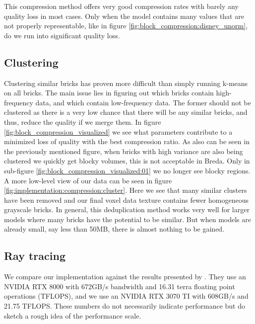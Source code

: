 This compression method offers very good compression rates with barely any quality loss in most cases. Only when the model contains many values that are not properly representable, like in figure \ref{fig:block_compression:disney_unorm}, do we run into significant quality loss.

\subsection{Clustering} \label{results:clustering}
Clustering similar bricks has proven more difficult than simply running k-means on all bricks. The main issue lies in figuring out which bricks contain high-frequency data, and which contain low-frequency data. The former should not be clustered as there is a very low chance that there will be any similar bricks, and thus, reduce the quality if we merge them. In figure \ref{fig:block_compression_visualized} we see what parameters contribute to a minimized loss of quality with the best compression ratio. As also can be seen in the previously mentioned figure, when bricks with high variance are also being clustered we quickly get blocky volumes, this is not acceptable in Breda. Only in sub-figure \ref{fig:block_compression_visualized:01} we no longer see blocky regions. A more low-level view of our data can be seen in figure \ref{fig:implementation:compression:cluster}. Here we see that many similar clusters have been removed and our final voxel data texture contains fewer homogeneous grayscale bricks.  In general, this deduplication method works very well for larger models where many bricks have the potential to be similar. But when models are already small, say less than 50MB, there is almost nothing to be gained.

\subsection{Ray tracing} \label{results:ray_tracing}
We compare our implementation against the results presented by \cite{NanoVDBBenchmark}. They use an NVIDIA RTX 8000 with 672GB/s bandwidth and 16.31 terra floating point operations (TFLOPS), and we use an NVIDIA RTX 3070 TI with 608GB/s and 21.75 TFLOPS. These numbers do not necessarily indicate performance but do sketch a rough idea of the performance scale.

